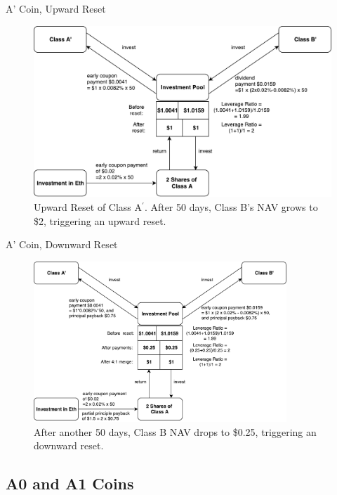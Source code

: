\documentclass[notes=show, beamer, handout]{beamer}
\begin{document}
\begin{frame}{A' Coin, Upward Reset}

\begin{figure}
\includegraphics[width=\textwidth]{Ap_upward.pdf}
\caption{\footnotesize Upward Reset of Class A$^\prime$. After 50 days, Class B's NAV grows to \$2, triggering an upward reset.}
\end{figure}

\end{frame}


\begin{frame}{A' Coin, Downward Reset}

\begin{figure}
\includegraphics[width=0.85\textwidth]{Ap_downward.pdf}
\caption{\footnotesize After another 50 days, Class B NAV drops to \$0.25, triggering an downward reset.}
\end{figure}

\end{frame}


\subsection{A0 and A1 Coins}
\end{document}
